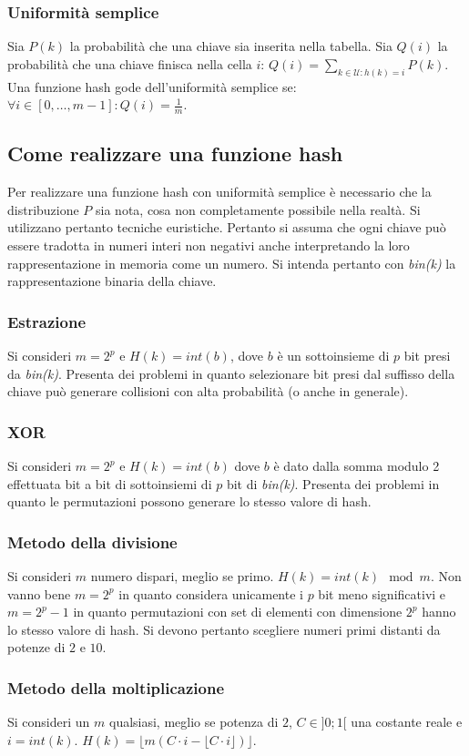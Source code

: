\subsubsection{Uniformit\`a semplice}
Sia $P(k)$ la probabilit\`a che una chiave sia inserita nella tabella. Sia $Q(i)$ la probabilit\`a che una chiave finisca nella cella $i$: $Q(i)=
\sum\limits_{k\in\mathcal{U}:h(k)=i}P(k)$. Una funzione hash gode dell'uniformit\`a semplice se: $\forall i\in [0,\dots, m-1]: Q(i)=\frac{1}{m}$.
\subsection{Come realizzare una funzione hash}
Per realizzare una funzione hash con uniformit\`a semplice \`e necessario che la distribuzione $P$ sia nota, cosa non completamente possibile nella 
realt\`a. Si utilizzano pertanto tecniche euristiche. Pertanto si assuma che ogni chiave pu\`o essere tradotta in numeri interi non negativi anche 
interpretando la loro rappresentazione in memoria come un numero. Si intenda pertanto con \emph{bin(k)} la rappresentazione binaria della chiave.
\subsubsection{Estrazione}
Si consideri $m=2^p$ e $H(k)=int(b)$, dove $b$ \`e un sottoinsieme di $p$ bit presi da \emph{bin(k)}. Presenta dei problemi in quanto selezionare bit presi
dal suffisso della chiave pu\`o generare collisioni con alta probabilit\`a (o anche in generale).
\subsubsection{XOR}
Si consideri $m=2^p$ e $H(k)=int(b)$ dove $b$ \`e dato dalla somma modulo 2 effettuata bit a bit di sottoinsiemi di $p$ bit di \emph{bin(k)}. Presenta dei 
problemi in quanto le permutazioni possono generare lo stesso valore di hash.
\subsubsection{Metodo della divisione}
Si consideri $m$ numero dispari, meglio se primo. $H(k)=int(k)\mod m$. Non vanno bene $m=2^p$ in quanto considera unicamente i $p$ bit meno significativi
e $m= 2^p-1$ in quanto permutazioni con set di elementi con dimensione $2^p$ hanno lo stesso valore di hash. Si devono pertanto scegliere numeri primi 
distanti da potenze di $2$ e $10$. 
\subsubsection{Metodo della moltiplicazione}
Si consideri un $m$ qualsiasi, meglio se potenza di $2$, $C\in]0;1[$ una costante reale e $i=int(k)$. $H(k)=\lfloor m(C\cdot i-\lfloor C\cdot i\rfloor)
\rfloor$.
